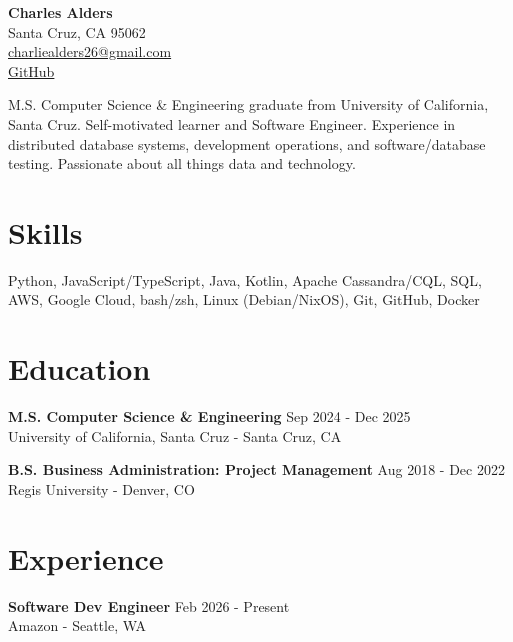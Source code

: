 \documentclass[a4paper,10pt]{article}
\begin{document}
\begin{center}
  {\LARGE \textbf{Charles Alders}} \\
  Santa Cruz, CA 95062 \\
  \href{mailto:charliealders26@gmail.com}{charliealders26@gmail.com} \\
  \href{https://github.com/char26}{GitHub}
\end{center}

\vspace{0.5cm}

\begin{flushleft}
  M.S. Computer Science \& Engineering graduate from University of California, Santa Cruz. Self-motivated learner and Software Engineer. Experience in distributed database systems, development operations, and software/database testing. Passionate about all things data and technology.
\end{flushleft}

\section*{Skills}
Python, JavaScript/TypeScript, Java, Kotlin, Apache Cassandra/CQL, SQL, AWS, Google Cloud, bash/zsh, Linux (Debian/NixOS), Git, GitHub, Docker

\section*{Education}
\begin{flushleft}
  \textbf{M.S. Computer Science \& Engineering} \hfill Sep 2024 - Dec 2025 \\
  University of California, Santa Cruz - Santa Cruz, CA
\end{flushleft}

\begin{flushleft}
  \textbf{B.S. Business Administration: Project Management} \hfill Aug 2018 - Dec 2022 \\
  Regis University - Denver, CO
\end{flushleft}
\section*{Experience}

\begin{flushleft}
  \textbf{Software Dev Engineer} \hfill Feb 2026 - Present \\
  Amazon - Seattle, WA \\
\end{flushleft}
\end{document}

